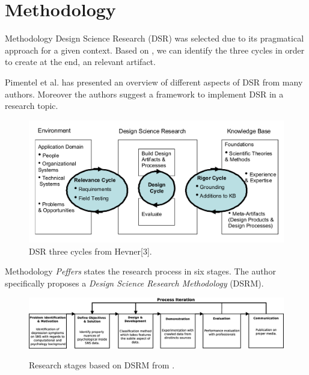 \documentclass[aspectratio=169,10pt,xcolor={dvipsnames}]{beamer}
\begin{document}
\section{Methodology}
\begin{frame}{Methodology}
  \vspace{15pt}
  \small{Design Science Research (DSR) was selected due to its pragmatical approach for a given context.
  Based on \cite{HevnerAlan2007}, we can identify the three cycles in order to create at the end, an relevant artifact.}

  \small{Pimentel et al. \cite{Pimentel2019} has presented an overview of different aspects of DSR from many authors. Moreover the authors suggest a framework to implement DSR in a research topic.}

  \begin{figure}
    \includegraphics[scale=.24]{Graphics/hevner_DSR.png}
    \vspace*{-8pt}
    \caption{\footnotesize{DSR three cycles from Hevner[3].}}  
  \end{figure}
\end{frame}

\begin{frame}{Methodology}
  \vspace{15pt}
  \emph{Peffers}\cite{Peffers2007} states the research process in six stages. The author specifically proposes a \emph{Design Science Research Methodology} (DSRM). 
  \begin{figure}
    \centering
   \hspace*{-20pt} \includegraphics[scale=.25]{Graphics/DSR_Peffer_instance.eps}
    \label{fig:DSR_Peffers_instance}
    \caption{Research stages based on DSRM from \cite{Peffers2007}.}
  \end{figure}
\end{frame}
\end{document}
